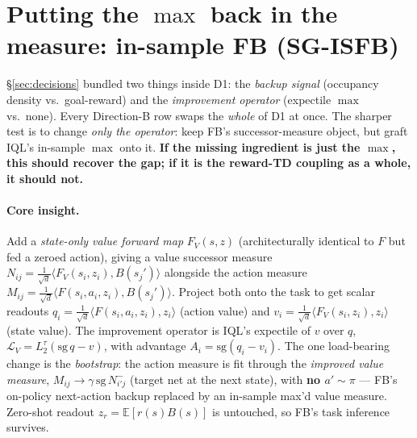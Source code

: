 \documentclass[11pt]{article}
\newcommand{\B}[1]{\textbf{#1}}
\begin{document}
\section{Putting the $\max$ back in the measure: in-sample FB (SG-ISFB)}
\label{sec:isfb}
\S\ref{sec:decisions} bundled two things inside D1: the \emph{backup signal}
(occupancy density vs.\ goal-reward) and the \emph{improvement operator} (expectile
$\max$ vs.\ none). Every Direction-B row swaps the \emph{whole} of D1 at once. The
sharper test is to change \emph{only the operator}: keep FB's successor-measure
object, but graft IQL's in-sample $\max$ onto it. \B{If the missing ingredient is
just the $\max$, this should recover the gap; if it is the reward-TD coupling as a
whole, it should not.}

\paragraph{Core insight.} Add a \emph{state-only value forward map} $F_V(s,z)$
(architecturally identical to $F$ but fed a zeroed action), giving a value successor
measure $N_{ij}=\tfrac1{\sqrt d}\langle F_V(s_i,z_i),B(s_j')\rangle$ alongside the
action measure $M_{ij}=\tfrac1{\sqrt d}\langle F(s_i,a_i,z_i),B(s_j')\rangle$.
Project both onto the task to get scalar readouts
$q_i=\tfrac1{\sqrt d}\langle F(s_i,a_i,z_i),z_i\rangle$ (action value) and
$v_i=\tfrac1{\sqrt d}\langle F_V(s_i,z_i),z_i\rangle$ (state value). The improvement
operator is IQL's expectile of $v$ over $q$, $\mathcal L_V=L_2^\tau(\mathrm{sg}\,q-v)$,
with advantage $A_i=\mathrm{sg}(q_i-v_i)$. The one load-bearing change is the
\emph{bootstrap}: the action measure is fit through the \emph{improved value
measure}, $M_{ij}\to\gamma\,\mathrm{sg}\,N^-_{i'j}$ (target net at the next state),
with \B{no $a'\sim\pi$} --- FB's on-policy next-action backup replaced by an
in-sample max'd value measure. Zero-shot readout $z_r=\mathbb E[r(s)B(s)]$ is
untouched, so FB's task inference survives.
\end{document}
